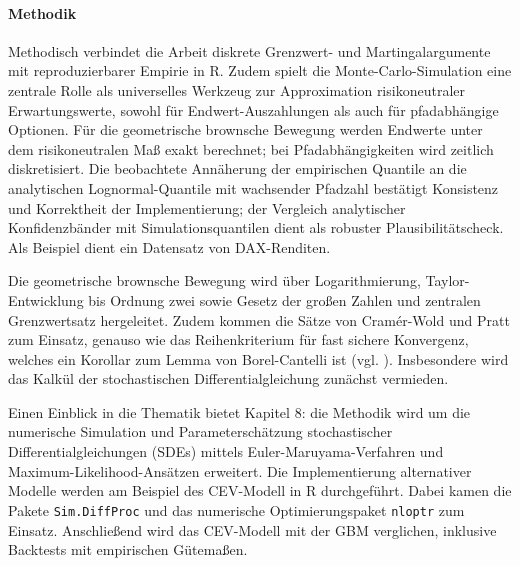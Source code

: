 \paragraph{Methodik}
Methodisch verbindet die Arbeit diskrete Grenzwert- und Martingalargumente mit 
reproduzierbarer Empirie in R. Zudem spielt die Monte-Carlo-Simulation eine zentrale Rolle als universelles 
Werkzeug zur Approximation risikoneutraler Erwartungswerte,
sowohl für Endwert-Auszahlungen als auch für pfadabhängige Optionen. Für die geometrische brownsche 
Bewegung werden Endwerte unter dem risikoneutralen Maß exakt berechnet; bei Pfadabhängigkeiten wird zeitlich diskretisiert.
Die beobachtete Annäherung der empirischen Quantile an die analytischen Lognormal-Quantile mit wachsender Pfadzahl bestätigt 
Konsistenz und Korrektheit der Implementierung; der Vergleich analytischer Konfidenzbänder mit Simulationsquantilen dient als robuster Plausibilitätscheck.
Als Beispiel dient ein Datensatz von DAX-Renditen.

Die geometrische brownsche Bewegung wird über Logarithmierung, Taylor-Entwicklung bis Ordnung zwei sowie Gesetz der großen Zahlen und 
zentralen Grenzwertsatz hergeleitet. Zudem kommen die Sätze von Cramér-Wold und Pratt zum Einsatz, 
genauso wie das Reihenkriterium für fast sichere Konvergenz, welches 
ein Korollar zum Lemma von Borel-Cantelli ist (vgl. \cite{henze}). Insbesondere wird das Kalkül der stochastischen Differentialgleichung zunächst vermieden.

Einen Einblick in die Thematik bietet Kapitel 8: die Methodik wird um die numerische Simulation und Parameterschätzung stochastischer Differentialgleichungen (SDEs) mittels Euler-Maruyama-Verfahren und Maximum-Likelihood-Ansätzen erweitert. 
Die Implementierung alternativer Modelle werden am Beispiel des CEV-Modell in R durchgeführt.
Dabei kamen die Pakete \texttt{Sim.DiffProc} und das numerische Optimierungspaket \texttt{nloptr} zum Einsatz.
Anschließend wird das CEV-Modell mit der GBM verglichen, inklusive Backtests mit empirischen Gütemaßen.

